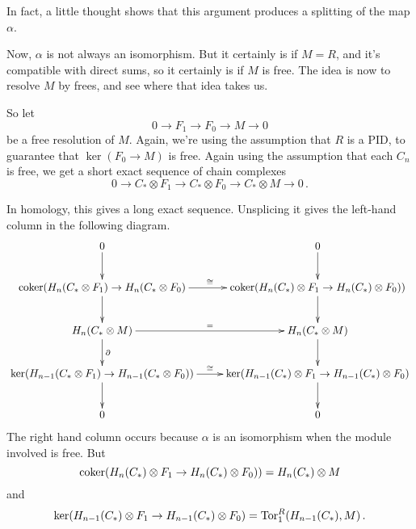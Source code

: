 In fact, a little thought shows that this argument produces a splitting of
the map $\alpha$. 

Now, $\alpha$ is not always an isomorphism. But it certainly is if $M=R$, 
and it's compatible with direct sums, so it certainly is if $M$ is free. 
The idea is now to resolve $M$ by frees, and see where that idea takes us.

So let 
\[
0\to F_1\to F_0\to M\to0
\]
be a free resolution of $M$. Again, we're using the assumption that $R$ is
a PID, to guarantee that $\ker(F_0\to M)$ is free. Again using the assumption
that each $C_n$ is free, we get a short exact sequence of chain complexes
\[
0\to C_*\otimes F_1\to C_*\otimes F_0\to C_*\otimes M\to0\,.
\]

In homology, this gives a long exact sequence. Unsplicing it gives the
left-hand column in the following diagram.
\begin{equation*}
\xymatrix{
0 \ar[d] & 0\ar[d] \\
\coker(H_n(C_\ast\otimes F_1)\to H_n(C_\ast\otimes F_0) \ar[d] \ar[r]^\cong 
& \coker(H_n(C_\ast)\otimes F_1\to H_n(C_\ast)\otimes F_0)) \ar[d] \\
H_n(C_\ast\otimes M) \ar[d]^\partial \ar[r]^= & 
H_n(C_\ast\otimes M) \ar[d]\\
\ker( H_{n-1}(C_\ast\otimes F_1)\to H_{n-1}(C_\ast\otimes F_0))
\ar[r]^\cong\ar[d] & 
\ker(H_{n-1}(C_*)\otimes F_1\to H_{n-1}(C_*)\otimes F_0) \ar[d]\\
0 & 0}
\end{equation*}
The right hand column occurs because $\alpha$ is an isomorphism when the module
involved is free. But 
\[
\operatorname{coker}(H_n(C_\ast)\otimes F_1\to H_n(C_\ast)\otimes F_0))=H_n(C_*)\otimes M
\]
and
\[
\ker(H_{n-1}(C_\ast)\otimes F_1\to H_{n-1}(C_\ast)\otimes F_0)=
\operatorname{Tor}^R_1(H_{n-1}(C_\ast),M)\,.
\]

